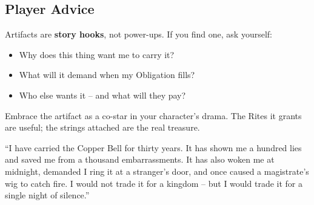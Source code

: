\subsection{Player Advice}

Artifacts are \textbf{story hooks}, not power-ups. If you find one, ask yourself:
\begin{itemize}
  \item Why does this thing want me to carry it?
  \item What will it demand when my Obligation fills?
  \item Who else wants it -- and what will they pay?
\end{itemize}
Embrace the artifact as a co-star in your character's drama. The Rites it grants are useful; the strings attached are the real treasure.

\begin{tcolorbox}[colback=blue!5!white,colframe=blue!70!black,title=The Gray Wanderer's Ledger,breakable]
``I have carried the Copper Bell for thirty years. It has shown me a hundred lies and saved me from a thousand embarrassments. It has also woken me at midnight, demanded I ring it at a stranger's door, and once caused a magistrate's wig to catch fire. I would not trade it for a kingdom -- but I would trade it for a single night of silence.''
\end{tcolorbox}